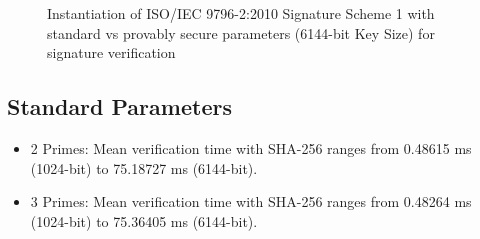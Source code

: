 \documentclass[]{final_report}
\theoremstyle{definition}
\begin{document}
\begin{figure}[H]
    \centering %
     \caption{Instantiation of ISO/IEC 9796-2:2010 Signature Scheme 1 with standard vs provably secure parameters (6144-bit Key Size) for signature verification}
    \begin{minipage}{\textwidth}
        \centering
    \end{minipage}
         \label{iso_verify_6144bit_table}
\end{figure}






\subsection*{Standard Parameters}
\begin{itemize}
\item 2 Primes: Mean verification time with SHA-256 ranges from 0.48615 ms (1024-bit) to 75.18727 ms (6144-bit).
\item 3 Primes: Mean verification time with SHA-256 ranges from 0.48264 ms (1024-bit) to 75.36405 ms (6144-bit).
\end{itemize}
\end{document}
